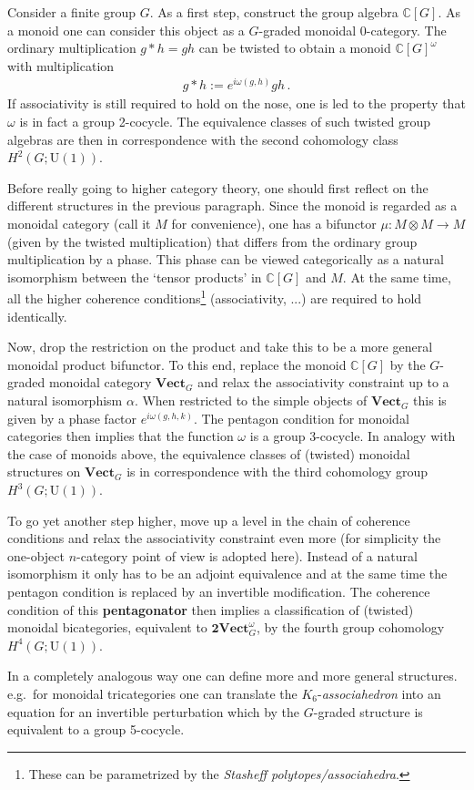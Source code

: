     Consider a finite group $G$. As a first step, construct the group algebra $\mathbb{C}[G]$. As a monoid one can consider this object as a $G$-graded monoidal 0-category. The ordinary multiplication $g\ast h=gh$ can be twisted to obtain a monoid $\mathbb{C}[G]^\omega$ with multiplication
    \begin{gather}
        g\ast h := e^{i\omega(g,h)}gh\,.
    \end{gather}
    If associativity is still required to hold on the nose, one is led to the property that $\omega$ is in fact a group 2-cocycle. The equivalence classes of such twisted group algebras are then in correspondence with the second cohomology class $H^2(G;\mathrm{U}(1))$.

    Before really going to higher category theory, one should first reflect on the different structures in the previous paragraph. Since the monoid is regarded as a monoidal category (call it $M$ for convenience), one has a bifunctor $\mu:M\otimes M\rightarrow M$ (given by the twisted multiplication) that differs from the ordinary group multiplication by a phase. This phase can be viewed categorically as a natural isomorphism between the `tensor products' in $\mathbb{C}[G]$ and $M$. At the same time, all the higher coherence conditions\footnote{These can be parametrized by the \textit{Stasheff polytopes/associahedra}.} (associativity, ...) are required to hold identically.

    Now, drop the restriction on the product and take this to be a more general monoidal product bifunctor. To this end, replace the monoid $\mathbb{C}[G]$ by the $G$-graded monoidal category $\mathbf{Vect}_G$ and relax the associativity constraint up to a natural isomorphism $\alpha$. When restricted to the simple objects of $\mathbf{Vect}_G$ this is given by a phase factor $e^{i\omega(g,h,k)}$. The pentagon condition for monoidal categories then implies that the function $\omega$ is a group 3-cocycle. In analogy with the case of monoids above, the equivalence classes of (twisted) monoidal structures on $\mathbf{Vect}_G$ is in correspondence with the third cohomology group $H^3(G;\mathrm{U}(1))$.

    To go yet another step higher, move up a level in the chain of coherence conditions and relax the associativity constraint even more (for simplicity the one-object $n$-category point of view is adopted here). Instead of a natural isomorphism it only has to be an adjoint equivalence and at the same time the pentagon condition is replaced by an invertible modification. The coherence condition of this \textbf{pentagonator} then implies a classification of (twisted) monoidal bicategories, equivalent to $\mathbf{2Vect}_G^\omega$, by the fourth group cohomology $H^4(G;\mathrm{U}(1))$.

    In a completely analogous way one can define more and more general structures. e.g.~for monoidal tricategories one can translate the $K_6$-\textit{associahedron} into an equation for an invertible perturbation which by the $G$-graded structure is equivalent to a group 5-cocycle.

